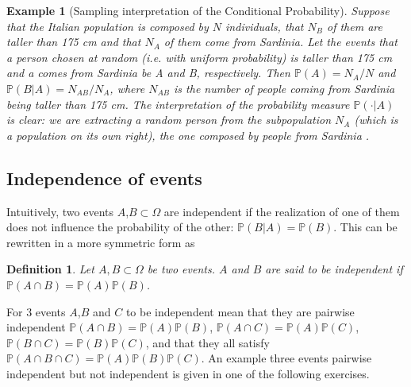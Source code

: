 \documentclass[12pt]{article}
\newtheorem{definition}[theorem]{Definition}
\newtheorem{example}[theorem]{Example}
\newcommand{\<}{{\langle \!\! \langle}}
\renewcommand{\>}{{\rangle \!\! \rangle}}
\begin{document}
	\begin{example}[Sampling interpretation of the Conditional Probability]


Suppose that the Italian population  is composed by $N$ individuals, that $N_B$  of them are taller than 175 cm and that $N_A$ of them come from Sardinia. Let the events that a person chosen at random (i.e. with uniform probability) is taller than 175 cm and a comes from Sardinia be A and B, respectively.
Then $\mathbb{P}(A) = N_A/N$ and $\mathbb{P}(B|A)=N_{AB}/N_{A}$, where $N_{AB}$ is the number of people coming from Sardinia being taller than 175 cm. The interpretation of the probability measure $\mathbb{P}(\cdot|A)$ is clear: we are extracting a random person from the subpopulation $N_A$ (which is a population on its own right), the one composed by people from Sardinia . 

\end{example}


		\subsection{Independence of events}
		
		Intuitively, two events $A$,$B\subset \Omega$ are independent if the realization of one of them does not influence the probability of the other: $\mathbb{P}(B|A)=\mathbb{P}(B)$. This can be rewritten in a more symmetric form as
		\begin{definition}
			Let $A, B\subset\Omega$ be two events. $A$ and $B$ are said to be independent if $\mathbb{P}(A \cap B) = \mathbb {P}(A) \mathbb{P}(B)$. 
		\end{definition}


 
For 3 events $A$,$B$ and $C$ to be independent mean that they are pairwise independent $\mathbb{P}(A \cap B)=\mathbb{P}(A)\mathbb{P}(B)$, $\mathbb{P}(A \cap C)=\mathbb{P}(A)\mathbb{P}(C)$,  $\mathbb{P}(B \cap C)=\mathbb{P}(B)\mathbb{P}(C)$, and that they all satisfy $\mathbb{P}(A\cap B \cap C)=\mathbb{P}(A)\mathbb{P} (B)\mathbb{P}(C)$. An example three events pairwise independent but not independent is given in one of the following  exercises. 
\end{document}
